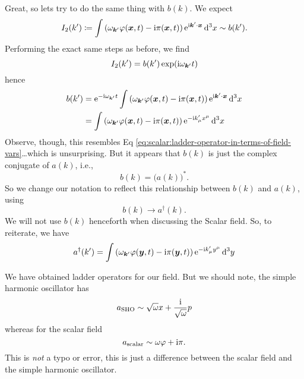 Great, so lets try to do the same thing with $b(k)$. We expect
\begin{equation}
I_{2}(k')\eqDef\int\left(\omega_{\vec{k}'}\varphi(\vec{x},t)-\I\pi(\vec{x},t)\right)\E^{\I\vec{k}'\cdot\vec{x}}\,\D^{3}x\looksLike b(k').
\end{equation}
Performing the exact same steps as before, we find
\begin{equation}
I_{2}(k') = b(k')\exp(\I\omega_{\vec{k}'}t)
\end{equation}
hence
\begin{equation}
\begin{split}
b(k') &= \E^{-\I\omega_{\vec{k}'}t}\int\left(\omega_{\vec{k}'}\varphi(\vec{x},t)-\I\pi(\vec{x},t)\right)\E^{\I\vec{k}'\cdot\vec{x}}\,\D^{3}x\\
&=
\int\left(\omega_{\vec{k}'}\varphi(\vec{x},t)-\I\pi(\vec{x},t)\right)\E^{-\I k'_{\mu}x^{\mu}}\,\D^{3}x
\end{split}
\end{equation}
Observe, though, this resembles Eq
\eqref{eq:scalar:ladder-operator-in-terms-of-field-vars}\dots which is
unsurprising. But it appears that $b(k)$ is just the complex conjugate
of $a(k)$, i.e.,
\begin{equation}
b(k) = \bigl(a(k)\bigr)^{*}.
\end{equation}
So we
change our notation to reflect this relationship between $b(k)$ and
$a(k)$, using
\begin{equation}
b(k)\to a^{\dagger}(k).
\end{equation}
We will not use $b(k)$ henceforth when discussing the Scalar field. So,
to reiterate, we have
\begin{equation}\label{eq:scalar:adjoint-ladder-operator-in-terms-of-field-vars}
a^{\dagger}(k') = \int\left(\omega_{\vec{k}'}\varphi(\vec{y},t)-\I\pi(\vec{y},t)\right)\E^{-\I k'_{\mu}y^{\mu}}\,\D^{3}y
\end{equation}

We have obtained ladder operators for our field. But we
should note, the simple harmonic oscillator has
\begin{equation}
a_{\text{SHO}}\sim \sqrt{\omega}x + \frac{\mathrm{i}}{\sqrt{\omega}}p
\end{equation}
whereas for the scalar field
\begin{equation}
a_{\text{scalar}}\sim \omega\varphi + \mathrm{i}\pi.
\end{equation}
This is \emph{not} a typo or error, this is just a difference
between the scalar field and the simple harmonic oscillator.

